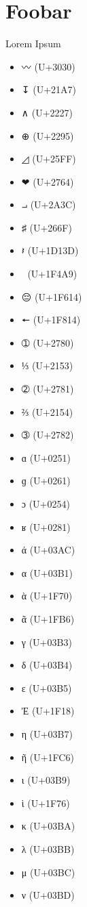 \documentclass[a4paper]{article}
\begin{document}
\section{Foobar}

Lorem Ipsum

\begin{itemize}

    \item 〰 (U+3030)
    \item ↧ (U+21A7)
    \item ∧ (U+2227)
    \item ⊕ (U+2295)
    \item ◿ (U+25FF)
    \item ❤ (U+2764)
    \item ⨼ (U+2A3C)
    \item ♯ (U+266F)
    \item 𝄽 (U+1D13D)
    \item 💩 (U+1F4A9)
    \item 😔 (U+1F614)
    \item 🠔 (U+1F814)
    \item ➀ (U+2780)
    \item ⅓ (U+2153)
    \item ➁ (U+2781)
    \item ⅔ (U+2154)
    \item ➂ (U+2782)
    \item ɑ (U+0251)
    \item ɡ (U+0261)
    \item ɔ (U+0254)
    \item ʁ (U+0281)
    \item ά (U+03AC)
    \item α (U+03B1)
    \item ὰ (U+1F70)
    \item ᾶ (U+1FB6)
    \item γ (U+03B3)
    \item δ (U+03B4)
    \item ε (U+03B5)
    \item Ἐ (U+1F18)
    \item η (U+03B7)
    \item ῆ (U+1FC6)
    \item ι (U+03B9)
    \item ὶ (U+1F76)
    \item κ (U+03BA)
    \item λ (U+03BB)
    \item μ (U+03BC)
    \item ν (U+03BD)

\end{itemize}
\end{document}

